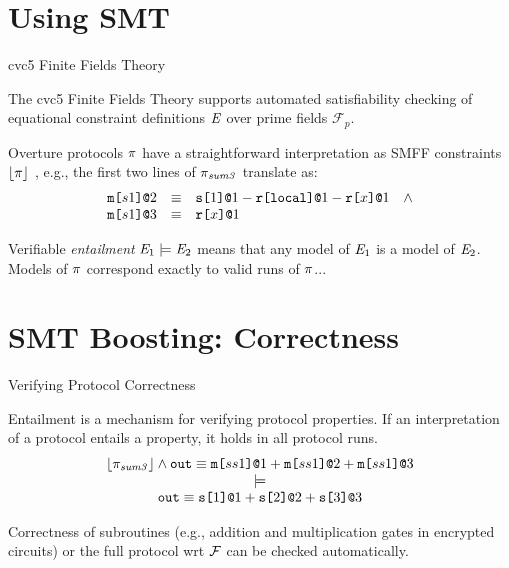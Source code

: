 \documentclass{beamer}
\newcommand{\sumthree}{\prog_{\mathit{sum3}}}
\begin{document}
\section{Using SMT}

\begin{frame}{cvc5 Finite Fields Theory}

  The cvc5 Finite Fields Theory supports automated satisfiability checking of equational
  constraint definitions $\mathit{E}$ over prime fields $\mathcal{F}_{p}$.

  \medskip
  
  Overture protocols $\pi$ have a straightforward interpretation as SMFF constraints $\lfloor \pi \rfloor$ , e.g.,
  the first two lines of $\pi_{\mathit{sum3}}$ translate as:
  $$
    \begin{array}{lll}
      \texttt{m[}s1\texttt{]}\texttt{@}2 &\equiv& \texttt{s[}1\texttt{]}\texttt{@}1 - \texttt{r[}\mathtt{local}\texttt{]}\texttt{@}1 - \texttt{r[}x\texttt{]}\texttt{@}1\quad \wedge \\ 
      \texttt{m[}s1\texttt{]}\texttt{@}3 &\equiv& \texttt{r[}x\texttt{]}\texttt{@}1 
    \end{array}
 $$

 Verifiable \emph{entailment} $\mathit{E}_1 \models \mathit{E}_2$ means that any model of $\mathit{E}_1$ is a model
 of $\mathit{E}_2$. Models of $\pi$ correspond exactly to valid runs of $\pi$...
  
\end{frame}

\section{SMT Boosting: Correctness}

\begin{frame}{Verifying Protocol Correctness}

  Entailment is a mechanism for verifying protocol properties. If an interpretation
  of a protocol entails a property, it holds in all protocol runs. 
$$
\begin{array}{c}
  \toeq{\sumthree} \wedge \ttt{out} \eop \mx{ss1}{1} + \mx{ss1}{2} + \mx{ss1}{3}\\ \models\\
  \ttt{out} \eop \sx{1}{1} \fplus \sx{2}{2} \fplus \sx{3}{3}
\end{array}
$$

Correctness of subroutines (e.g., addition and multiplication gates in encrypted circuits)
or the full protocol wrt $\mathcal{F}$ can be checked automatically.
\end{frame}
\end{document}
